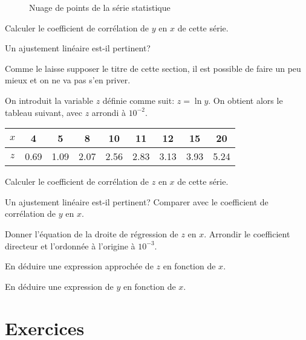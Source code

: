 \documentclass[a4paper,12pt]{scrartcl}
\begin{document}
\begin{figure}[h]
\begin{center}
\end{center} 
\caption{Nuage de points de la série statistique}
\label{fig:expo}
\end{figure}

Calculer le coefficient de corrélation de $y$ en $x$ de cette série. %


Un ajustement linéaire est-il pertinent?


Comme le laisse supposer le titre de cette section, il est possible de faire un peu mieux et on ne va pas s'en priver.

On introduit la variable $z$ définie comme suit: $z = \ln y$. On obtient alors le tableau suivant, avec $z$ arrondi à $10^{-2}$.

\begin{center}
    \begin{tabular}{|c|c|c|c|c|c|c|c|c|}
        \hline
        $x$ & 4  & 5  & 8  & 10 & 11 & 12 & 15  & 20  \\ \hline
        $z$ & 0.69 & 1.09 & 2.07 & 2.56 & 2.83 & 3.13 & 3.93 & 5.24 \\ \hline
    \end{tabular}
\end{center}

Calculer le coefficient de corrélation de $z$ en $x$ de cette série. %


Un ajustement linéaire est-il pertinent? Comparer avec le coefficient de corrélation de $y$ en $x$. %


Donner l'équation de la droite de régression de $z$ en $x$. Arrondir le coefficient directeur et l'ordonnée à l'origine à $10^{-3}$. %


En déduire une expression approchée de $z$ en fonction de $x$.


En déduire une expression de $y$ en fonction de $x$.


\section*{Exercices}
\end{document}
